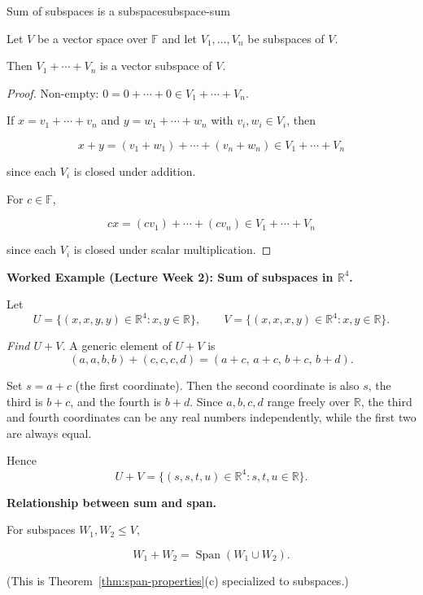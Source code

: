 \begin{theorem}{Sum of subspaces is a subspace}{subspace-sum}

Let $V$ be a vector space over $\mathbb{F}$ and let $V_1,\dots,V_n$ be subspaces of $V$.

Then $V_1+\cdots+V_n$ is a vector subspace of $V$.

\end{theorem}

\begin{proof}

Non-empty: $0=0+\cdots+0\in V_1+\cdots+V_n$.

If $x=v_1+\cdots+v_n$ and $y=w_1+\cdots+w_n$ with $v_i,w_i\in V_i$, then

\[
x+y=(v_1+w_1)+\cdots+(v_n+w_n)\in V_1+\cdots+V_n
\]

since each $V_i$ is closed under addition.

For $c\in\mathbb{F}$,

\[
cx=(cv_1)+\cdots+(cv_n)\in V_1+\cdots+V_n
\]

since each $V_i$ is closed under scalar multiplication.

\end{proof}

\begin{examplebox}
\textbf{Worked Example (Lecture Week 2): Sum of subspaces in $\mathbb{R}^4$.}

Let
\[
U=\{(x,x,y,y)\in\mathbb{R}^4:x,y\in\mathbb{R}\},\qquad
V=\{(x,x,x,y)\in\mathbb{R}^4:x,y\in\mathbb{R}\}.
\]

\emph{Find $U+V$.}  A generic element of $U+V$ is
\[
(a,a,b,b)+(c,c,c,d)=(a+c,\,a+c,\,b+c,\,b+d).
\]

Set $s=a+c$ (the first coordinate).  Then the second coordinate is also $s$, the third is $b+c$, and the fourth is $b+d$.  Since $a,b,c,d$ range freely over $\mathbb{R}$, the third and fourth coordinates can be any real numbers independently, while the first two are always equal.

Hence
\[
U+V=\{(s,s,t,u)\in\mathbb{R}^4 : s,t,u\in\mathbb{R}\}.
\]
\end{examplebox}

\begin{keyformula}

\textbf{Relationship between sum and span.}

For subspaces $W_1,W_2\le V$,

\[
W_1+W_2=\operatorname{Span}(W_1\cup W_2).
\]

(This is Theorem~\ref{thm:span-properties}(c) specialized to subspaces.)

\end{keyformula}

